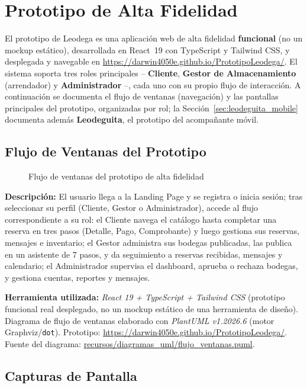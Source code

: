 \section{Prototipo de Alta Fidelidad}
\noindent El prototipo de Leodega es una aplicación web de alta fidelidad \textbf{funcional} (no un mockup estático), desarrollada en React~19 con TypeScript y Tailwind CSS, y desplegada y navegable en \url{https://darwin4050e.github.io/PrototipoLeodega/}. El sistema soporta tres roles principales -- \textbf{Cliente}, \textbf{Gestor de Almacenamiento} (arrendador) y \textbf{Administrador} --, cada uno con su propio flujo de interacción. A continuación se documenta el flujo de ventanas (navegación) y las pantallas principales del prototipo, organizadas por rol; la Sección~\ref{sec:leodeguita_mobile} documenta además \textbf{Leodeguita}, el prototipo del acompañante móvil.

\subsection{Flujo de Ventanas del Prototipo}
\begin{figure}[H]
    \centering
    \caption{Flujo de ventanas del prototipo de alta fidelidad}
    \label{fig:flujo_ventanas}
\end{figure}
\noindent\textbf{Descripción:} El usuario llega a la Landing Page y se registra o inicia sesión; tras seleccionar su perfil (Cliente, Gestor o Administrador), accede al flujo correspondiente a su rol: el Cliente navega el catálogo hasta completar una reserva en tres pasos (Detalle, Pago, Comprobante) y luego gestiona sus reservas, mensajes e inventario; el Gestor administra sus bodegas publicadas, las publica en un asistente de 7 pasos, y da seguimiento a reservas recibidas, mensajes y calendario; el Administrador supervisa el dashboard, aprueba o rechaza bodegas, y gestiona cuentas, reportes y mensajes.

\bigskip
{\sloppy\noindent\textbf{Herramienta utilizada:} \textit{React 19 + TypeScript + Tailwind CSS} (prototipo funcional real desplegado, no un mockup estático de una herramienta de diseño). Diagrama de flujo de ventanas elaborado con \textit{PlantUML v1.2026.6} (motor Graphviz/\texttt{dot}). Prototipo: \url{https://darwin4050e.github.io/PrototipoLeodega/}. Fuente del diagrama: \url{recursos/diagramas_uml/flujo_ventanas.puml}.\par}
\clearpage

\subsection{Capturas de Pantalla}

